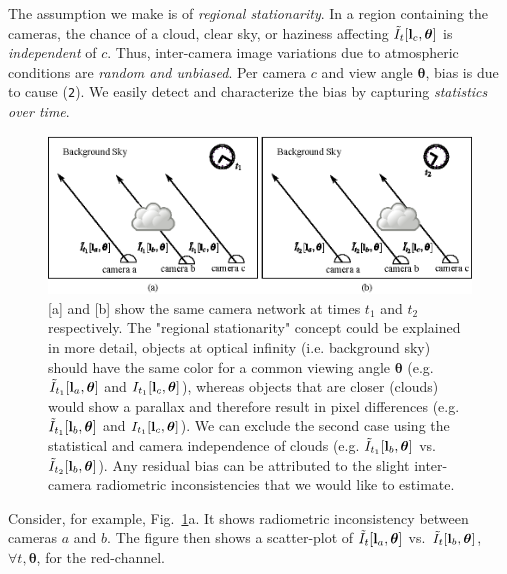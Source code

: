 \documentclass[runningheads]{llncs}
\begin{document}
The assumption we make is of {\em regional stationarity}. In a region containing the cameras, the chance of a cloud, clear sky, or haziness affecting $\tilde I_t[{\bf l}_c,{\bm \theta}]$ is {\em independent} of $c$. Thus, inter-camera image variations due to atmospheric conditions are {\em random and unbiased}. Per camera $c$ and view angle ${\bm \theta}$, bias is due to cause ({\tt 2}). We easily detect and characterize the bias by capturing {\em statistics over time}.
\begin{figure}[t!]
  \begin{center}
    \includegraphics[width=\linewidth]{figures/regional_stationarity.eps}
  \end{center}
  \vspace{-0.6cm}
  \caption{[a] and [b] show the same camera network at times $t_1$ and
    $t_2$ respectively. The "regional stationarity"
concept could be explained in more detail, objects at optical infinity (i.e. background
    sky) should have the same color for a common viewing angle ${\bm
      \theta}$ (e.g. $\tilde I_{t_1}[{\bf l}_a,{\bm \theta}]$ and
    $I_{t_1}[{\bf l}_c,{\bm \theta}]$), whereas objects that are
    closer (clouds) would show a parallax and therefore result in
    pixel differences (e.g. $\tilde I_{t_1}[{\bf l}_b,{\bm \theta}]$
    and $I_{t_1}[{\bf l}_c,{\bm \theta}]$). We can exclude the second
    case using the statistical and camera independence of clouds
    (e.g. $\tilde I_{t_1}[{\bf l}_b,{\bm \theta}]$ vs. $\tilde
    I_{t_2}[{\bf l}_b,{\bm \theta}]$). Any residual bias can be
    attributed to the slight inter-camera radiometric inconsistencies
    that we would like to estimate.  }
  \label{fig:calibration}
\end{figure}
Consider, for example, Fig.~\ref{fig:calibration}a. It shows radiometric inconsistency between cameras $a$ and $b$. The figure then shows a scatter-plot of
$\tilde I_t[{\bf l}_a,{\bm \theta}]$ vs.~$\tilde I_t[{\bf l}_{b},{\bm \theta}]$, $\forall t,{\bm \theta}$, for the red-channel.
\end{document}
